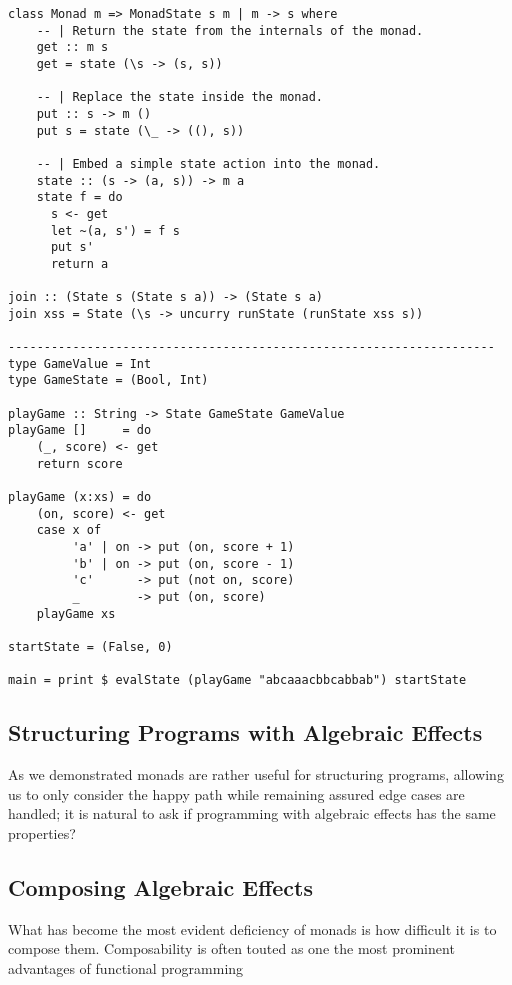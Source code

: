 \begin{verbatim}
class Monad m => MonadState s m | m -> s where
    -- | Return the state from the internals of the monad.
    get :: m s
    get = state (\s -> (s, s))

    -- | Replace the state inside the monad.
    put :: s -> m ()
    put s = state (\_ -> ((), s))

    -- | Embed a simple state action into the monad.
    state :: (s -> (a, s)) -> m a
    state f = do
      s <- get
      let ~(a, s') = f s
      put s'
      return a

join :: (State s (State s a)) -> (State s a)
join xss = State (\s -> uncurry runState (runState xss s))

--------------------------------------------------------------------
type GameValue = Int
type GameState = (Bool, Int)

playGame :: String -> State GameState GameValue
playGame []     = do
    (_, score) <- get
    return score

playGame (x:xs) = do
    (on, score) <- get
    case x of
         'a' | on -> put (on, score + 1)
         'b' | on -> put (on, score - 1)
         'c'      -> put (not on, score)
         _        -> put (on, score)
    playGame xs

startState = (False, 0)

main = print $ evalState (playGame "abcaaacbbcabbab") startState
\end{verbatim}

\subsection{Structuring Programs with Algebraic Effects}
As we demonstrated monads are rather useful for structuring programs,
allowing us to only consider the happy path while remaining assured
edge cases are handled;
it is natural to ask if programming with algebraic effects
has the same properties?

\begin{example}
\end{example}

\subsection{Composing Algebraic Effects}
What has become the most evident deficiency of monads is
how difficult it is to compose them.
Composability is often touted as one the most
prominent advantages of functional programming


